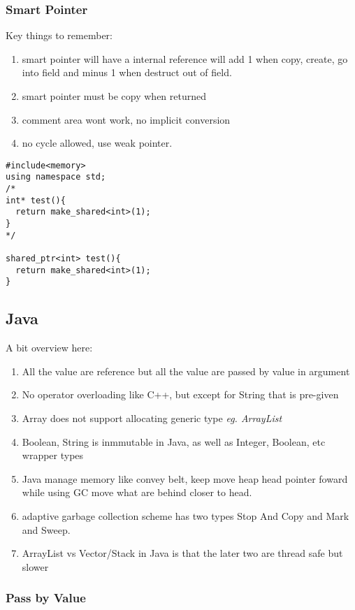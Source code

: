 \subsubsection{Smart Pointer}
Key things to remember:
\begin{enumerate}
\item smart pointer will have a internal reference will add 1 when copy, create, go into field and minus 1 when destruct out of field.
\item smart pointer must be copy when returned
\item comment area wont work, no implicit conversion
\item no cycle allowed, use weak pointer.
\end{enumerate}

\begin{lstlisting}
#include<memory>
using namespace std;
/*
int* test(){
  return make_shared<int>(1);
}
*/

shared_ptr<int> test(){
  return make_shared<int>(1);
}
\end{lstlisting}

\subsection{Java}
A bit overview here:
\begin{enumerate}
\item All the value are reference but all the value are passed by value in argument
\item No operator overloading like C++, but {\color{red} except for String that is pre-given}
\item Array does not support allocating generic type \textit{eg. ArrayList}
\item Boolean, String is inmmutable in Java, as well as {\color{blue} Integer, Boolean, etc} wrapper types
\item Java manage memory like convey belt, keep move heap head pointer foward while using GC move what are behind closer to head.
\item {\color{blue} adaptive garbage collection scheme} has two types {\color{blue} Stop And Copy} and {\color{blue} Mark and Sweep}.
\item ArrayList vs Vector/Stack in Java is that the later two are thread safe but slower
\end{enumerate}

\subsubsection{Pass by Value}

